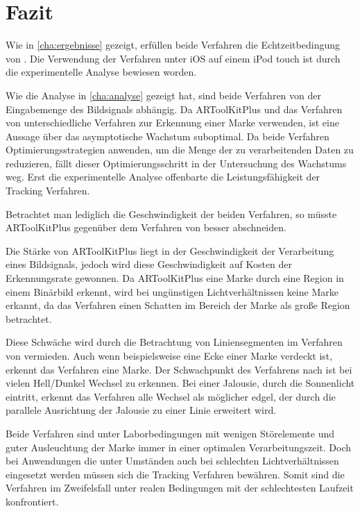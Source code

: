 \chapter{Fazit} %
\label{cha:fazit}

Wie in \autoref{cha:ergebnisse} gezeigt, erfüllen beide Verfahren die Echtzeitbedingung von \citeauthor{azuma97}. Die Verwendung der Verfahren unter iOS auf einem iPod touch ist durch die experimentelle Analyse bewiesen worden.

Wie die Analyse in \autoref{cha:analyse} gezeigt hat, sind beide Verfahren von der Eingabemenge des Bildsignals abhängig. Da ARToolKitPlus und das Verfahren von \citeauthor{hirzer08} unterschiedliche Verfahren zur Erkennung einer Marke verwenden, ist eine Aussage über das asymptotische Wachstum suboptimal. Da beide Verfahren Optimierungsstrategien anwenden, um die Menge der zu verarbeitenden Daten zu reduzieren, fällt dieser Optimierungsschritt in der Untersuchung des Wachstums weg. Erst die experimentelle Analyse offenbarte die Leistungsfähigkeit der Tracking Verfahren.

Betrachtet man lediglich die Geschwindigkeit der beiden Verfahren, so müsste ARToolKitPlus gegenüber dem Verfahren von \citeauthor{hirzer08} besser abschneiden.

Die Stärke von ARToolKitPlus liegt in der Geschwindigkeit der Verarbeitung eines Bildsignals, jedoch wird diese Geschwindigkeit auf Kosten der Erkennungsrate gewonnen. Da ARToolKitPlus eine Marke durch eine Region in einem Binärbild erkennt, wird bei ungünstigen Lichtverhältnissen keine Marke erkannt, da das Verfahren einen Schatten im Bereich der Marke als große Region betrachtet.

Diese Schwäche wird durch die Betrachtung von Liniensegmenten im Verfahren von \citeauthor{hirzer08} vermieden. Auch wenn beispielsweise eine Ecke einer Marke verdeckt ist, erkennt das Verfahren eine Marke. Der Schwachpunkt des Verfahrens nach \citeauthor{hirzer08} ist bei vielen Hell/Dunkel Wechsel zu erkennen. Bei einer Jalousie, durch die Sonnenlicht eintritt, erkennt das Verfahren alle Wechsel als möglicher \gls{edgel}, der durch die parallele Ausrichtung der Jalousie zu einer Linie erweitert wird.

Beide Verfahren sind unter Laborbedingungen mit wenigen Störelemente und guter Ausleuchtung der Marke immer in einer optimalen Verarbeitungszeit. Doch bei Anwendungen die unter Umständen auch bei schlechten Lichtverhältnissen eingesetzt werden müssen sich die Tracking Verfahren bewähren. Somit sind die Verfahren im Zweifelsfall unter realen Bedingungen mit der schlechtesten Laufzeit konfrontiert.

